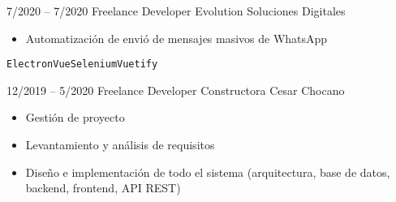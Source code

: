 
\begin{entrylist}
	\entry
		{7/2020 -- 7/2020}
		{Freelance Developer}
		{Evolution Soluciones Digitales}
		{
		    \vspace{-5mm}
    	    \begin{itemize}
    	        \setlength\itemsep{0pt}
    	        \item Automatización de envió de mensajes masivos de WhatsApp
    	    \end{itemize}
		    \texttt{Electron}\slashsep\texttt{Vue}\slashsep\texttt{Selenium}\slashsep\texttt{Vuetify}
        }
    \entry
		{12/2019 -- 5/2020}
		{Freelance Developer}
		{Constructora Cesar Chocano}
		{
		    \vspace{-5mm}
    	    \begin{itemize}
    	        \setlength\itemsep{0pt}
    	        \item Gestión de proyecto
    	        \item Levantamiento y análisis de requisitos
    	        \item Diseño e implementación de todo el sistema (arquitectura, base de datos, backend, frontend, API REST)

\end{itemize}}
\end{entrylist}
